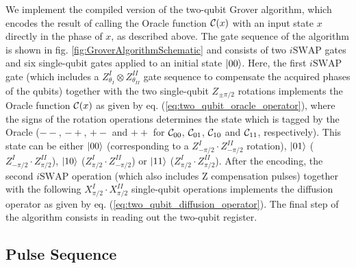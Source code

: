 We implement the compiled version of the two-qubit Grover algorithm, which encodes the result of calling the Oracle function $\Or(x)$ with an input state $x$ directly in the phase of $x$, as described above. The gate sequence of the algorithm is shown in fig. \ref{fig:GroverAlgorithmSchematic} and consists of two $i\mathrm{SWAP}$ gates and six single-qubit gates applied to an initial state $\left| 00 \right>$. Here, the first $i\mathrm{SWAP}$ gate (which includes a $Z_{\theta_I}^I\otimes Z_{\theta_{II}}^{II}$ gate sequence to compensate the acquired phases of the qubits) together with the two single-qubit $Z_{\pm \pi/2}$ rotations implements the Oracle function $\Or(x)$ as given by eq. (\ref{eq:two_qubit_oracle_operator}), where the signs of the rotation operations determines the state which is tagged by the Oracle ($--$, $-+$, $+-$ and $++$ for $\Or_{00}$, $\Or_{01}$, $\Or_{10}$ and $\Or_{11}$, respectively). This state can be either $\left| 00 \right>$ (corresponding to a $Z^I_{-\pi/2}\cdot Z^{II}_{-\pi/2}$ rotation), $\left| 01 \right>$ ($Z^I_{-\pi/2}\cdot Z^{II}_{\pi/2}$), $\left| 10 \right>$ ($Z^I_{\pi/2}\cdot Z^{II}_{-\pi/2}$) or $\left| 11 \right>$ ($Z^I_{\pi/2}\cdot Z^{II}_{\pi/2}$). After the encoding, the second $i\mathrm{SWAP}$ operation (which also includes Z compensation pulses) together with the following $X^I_{\pi/2}\cdot X^{II}_{\pi/2}$ single-qubit operations implements the diffusion operator as given by eq. (\ref{eq:two_qubit_diffusion_operator}). The final step of the algorithm consists in reading out the two-qubit register.

\subsection{Pulse Sequence}

